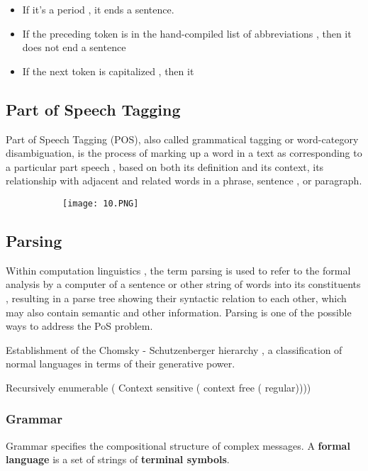 \documentclass{article}
\begin{document}
\begin{itemize}
    \item If it's a period , it ends a sentence.
    \item If the preceding token is in the hand-compiled list of abbreviations , then it does not end a sentence
    \item If the next token is capitalized , then it
\end{itemize}

\subsection{Part of Speech Tagging}

Part of Speech Tagging (POS), also called grammatical tagging or word-category disambiguation, is the process of marking up a word in a text as corresponding to a particular part speech , based on both its definition and its context, its relationship with adjacent and related words in a phrase, sentence , or paragraph.

\begin{figure}[ht!]
  \centering
  \begin{subfigure}[b]{1\linewidth}
    \texttt{[image: 10.PNG]}
  \end{subfigure}
\end{figure}

\subsection{Parsing}

Within computation linguistics , the term parsing is used to refer to the formal analysis by a computer of a sentence or other string of words into its constituents , resulting in a parse tree showing their syntactic relation to each other, which may also contain semantic and other information.
Parsing is one of the possible ways to address the PoS problem.

Establishment of the Chomsky - Schutzenberger hierarchy , a classification of normal languages in terms of their generative power.

Recursively enumerable ( Context sensitive ( context free ( regular))))

\subsubsection{Grammar}

Grammar specifies the compositional structure of complex messages. A \textbf{formal language} is a set of strings of \textbf{terminal symbols}.
\end{document}
